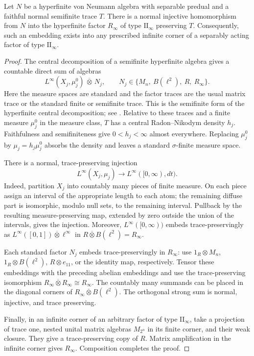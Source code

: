 \begin{lemma}\label{tc:semifinite-embedding}
Let $N$ be a hyperfinite von Neumann algebra with separable predual and a
faithful normal semifinite trace $T$.  There is a normal injective
homomorphism from $N$ into the hyperfinite factor $R_\infty$ of type
$\mathrm{II}_\infty$ preserving $T$.  Consequently, such an embedding
exists into any prescribed infinite corner of a separably acting factor
of type $\mathrm{II}_\infty$.
\end{lemma}

\begin{proof}
The central decomposition of a semifinite hyperfinite algebra gives a
countable direct sum of algebras
\[
 L^\infty(X_j,\mu_j^0)\,\overline\otimes\,N_j,
 \qquad
 N_j\in\{M_n,\ B(\ell^2),\ R,\ R_\infty\}.
\]
Here the measure spaces are standard and the factor traces are the
usual matrix trace or the standard finite or semifinite trace.  This is
the semifinite form of the hyperfinite central decomposition; see
\cite[Section~6, p.~49, after (6.48) and (6.50)]{HRS}.  Relative to these
traces and a finite measure $\mu_j^0$ in the measure class, $T$ has a
central Radon--Nikodym density $h_j$.  Faithfulness and semifiniteness
give $0<h_j<\infty$ almost everywhere.  Replacing $\mu_j^0$ by
$\mu_j=h_j\mu_j^0$ absorbs the density and leaves a standard
$\sigma$-finite measure space.

There is a normal, trace-preserving injection
\[
 L^\infty(X_j,\mu_j)\longrightarrow
 L^\infty([0,\infty),dt).
\]
Indeed, partition $X_j$ into countably many pieces of finite measure.
On each piece assign an interval of the appropriate length to each
atom; the remaining diffuse part is isomorphic, modulo null sets, to
the remaining interval.  Pullback by the resulting measure-preserving
map, extended by zero outside the union of the intervals, gives the
injection.  Moreover,
$L^\infty([0,\infty))$ embeds trace-preservingly as
$L^\infty([0,1])\overline\otimes\ell^\infty$ in
$R\overline\otimes B(\ell^2)=R_\infty$.

Each standard factor $N_j$ embeds trace-preservingly in $R_\infty$:
use $1_R\otimes M_n$, $1_R\otimes B(\ell^2)$,
$R\otimes e_{11}$, or the identity map, respectively.  Tensor these
embeddings with the preceding abelian embeddings and use the
trace-preserving isomorphism
$R_\infty\overline\otimes R_\infty\cong R_\infty$.
The countably many summands can be placed in the diagonal corners of
$R_\infty\overline\otimes B(\ell^2)$.  The orthogonal strong sum is
normal, injective, and trace preserving.

Finally, in an infinite corner of an arbitrary factor of type
$\mathrm{II}_\infty$, take a projection of trace one, nested unital
matrix algebras $M_{2^n}$ in its finite corner, and their weak closure.
They give a trace-preserving copy of $R$.  Matrix amplification in the
infinite corner gives $R_\infty$.  Composition completes the proof.
\end{proof}

